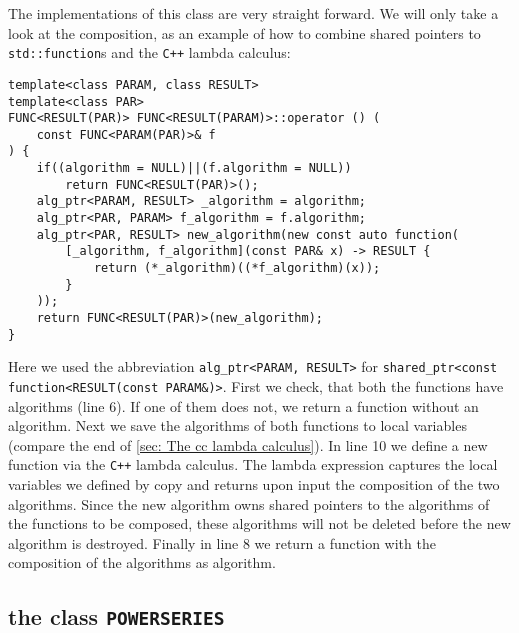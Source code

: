 \documentclass{article}
\newcommand{\cc}{\texttt{C++}\xspace}
\newcommand{\code}[1]{\texttt{#1}}
\newcommand{\func}[1]{\texttt{#1}}
\begin{document}
The implementations of this class are very straight forward. We will only take a look at the composition, as an example of how to combine shared pointers to \code{std::function}s and the \cc lambda calculus:
\begin{lstlisting}
template<class PARAM, class RESULT>
template<class PAR>
FUNC<RESULT(PAR)> FUNC<RESULT(PARAM)>::operator () (
	const FUNC<PARAM(PAR)>& f
) {
	if((algorithm = NULL)||(f.algorithm = NULL))
		return FUNC<RESULT(PAR)>();
	alg_ptr<PARAM, RESULT> _algorithm = algorithm;
	alg_ptr<PAR, PARAM> f_algorithm = f.algorithm;
	alg_ptr<PAR, RESULT> new_algorithm(new const auto function(
		[_algorithm, f_algorithm](const PAR& x) -> RESULT {
			return (*_algorithm)((*f_algorithm)(x));
		}
	));
	return FUNC<RESULT(PAR)>(new_algorithm);
}
\end{lstlisting}
Here we used the abbreviation \code{alg\_ptr<PARAM, RESULT>} for \code{shared\_ptr<const function<RESULT(const PARAM\&)>}. First we check, that both the functions have algorithms (line 6). If one of them does not, we return a function without an algorithm. Next we save the algorithms of both functions to local variables (compare the end of \cref{sec: The cc lambda calculus}). In line 10 we define a new function via the \cc lambda calculus. The lambda expression captures the local variables we defined by copy and returns upon input the composition of the two algorithms. Since the new algorithm owns shared pointers to the algorithms of the functions to be composed, these algorithms will not be deleted before the new algorithm is destroyed. Finally in line 8 we return a function with the composition of the algorithms as algorithm.


\subsection{the class \func{POWERSERIES}}
\end{document}
